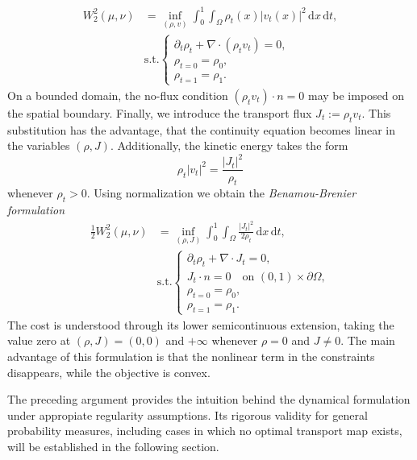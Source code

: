 \begin{equation}
	\begin{aligned}
		W_2^2(\mu,\nu) &= \inf_{(\rho,v)}
		\int_0^1\int_\Omega\rho_t(x)|v_t(x)|^2\,\mathrm{d}x\,\mathrm{d}t,\\
											 &\text{s.t.}\begin{cases}\partial_t\rho_t + \nabla\cdot(\rho_tv_t)=0,\\
						\rho_{t=0}=\rho_0,\\
						\rho_{t=1}=\rho_1.\end{cases}
	\end{aligned}
	\label{eq:dynamic_ot}
\end{equation}
On a bounded domain, the no-flux condition $(\rho_t v_t)\cdot n = 0$ may be imposed on the spatial boundary. Finally, we introduce the transport flux $J_t := \rho_t v_t.$ This substitution has the advantage, that the continuity equation becomes linear in the variables $(\rho,J)$. Additionally, the kinetic energy takes the form 
$$
\rho_t|v_t|^2 = \frac{|J_t|^2}{\rho_t}
$$
whenever $\rho_t>0$. Using normalization we obtain the \emph{Benamou-Brenier formulation}
\begin{equation}
	\begin{aligned}
		\frac{1}{2}W_2^2(\mu,\nu) &= \inf_{(\rho,J)}
		\int_0^1\int_\Omega\frac{|J_t|^2}{2\rho_t}\,\mathrm{d}x\,\mathrm{d}t,\\
								  &\text{s.t.}\begin{cases}\partial_t\rho_t + \nabla\cdot J_t = 0,\\
						J_t\cdot n = 0\quad\text{on }(0,1)\times\partial\Omega,\\
						\rho_{t=0}=\rho_0,\\
					\rho_{t=1}=\rho_1.\end{cases}
	\end{aligned}
	\label{eq:BB}
\end{equation}
The cost is understood through its lower semicontinuous extension, taking the value zero at $(\rho,J) = (0,0)$ and $+\infty$ whenever $\rho=0$ and $J\neq 0$. The main advantage of this formulation is that the nonlinear term in the constraints disappears, while the objective is convex. 

The preceding argument provides the intuition behind the dynamical formulation under appropiate regularity assumptions. Its rigorous validity for general probability measures, including cases in which no optimal transport map exists, will be established in the following section.




